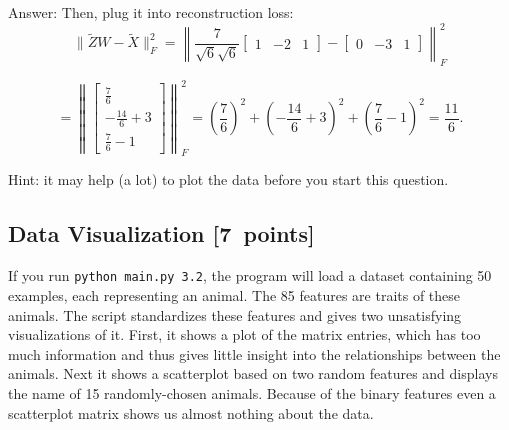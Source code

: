 \documentclass{article}
\newenvironment{answer}{\par\begingroup\color{gre}Answer: }{\endgroup}
\newcommand\pts[1]{\textcolor{pointscolour}{[#1~points]}}
\begin{document}
\begin{enumerate}
\begin{answer}
Then, plug it into reconstruction loss:
\[
\| \tilde{Z} W - \tilde{X} \|_F^2 = \left\|
\frac{7}{\sqrt{6}\sqrt{6}}
\begin{bmatrix}
1 & -2 & 1
\end{bmatrix}
-
\begin{bmatrix}
0 & -3 & 1
\end{bmatrix}
\right\|_F^2
\]

\[
= \left\|
\begin{bmatrix}
\frac{7}{6} \\
-\frac{14}{6} + 3 \\
\frac{7}{6} - 1
\end{bmatrix}
\right\|_F^2
= \left(\frac{7}{6}\right)^2 + \left(-\frac{14}{6} + 3\right)^2 + \left(\frac{7}{6} - 1\right)^2
= \frac{11}{6}.
\]

\end{answer}

\end{enumerate}
Hint: it may help (a lot) to plot the data before you start this question.



\subsection{Data Visualization \pts{7}}

If you run \verb|python main.py 3.2|, the program will load a dataset containing 50 examples, each representing an animal.
The 85 features are traits of these animals.
The script standardizes these features and gives two unsatisfying visualizations of it.
First, it shows a plot of the matrix entries, which has too much information and thus gives little insight into the relationships between the animals.
Next it shows a scatterplot based on two random features and displays the name of 15 randomly-chosen animals.
Because of the binary features even a scatterplot matrix shows us almost nothing about the data.
\end{document}
